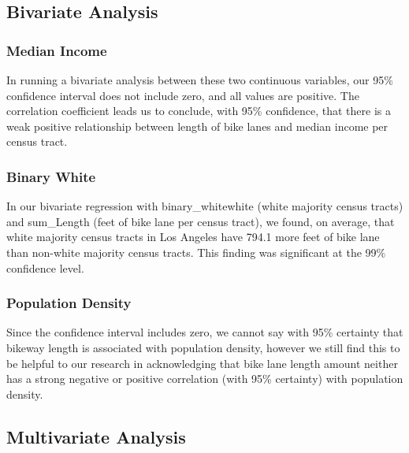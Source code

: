 \documentclass[
]{article}
\begin{document}
\hypertarget{bivariate-analysis}{%
\subsection{Bivariate Analysis}\label{bivariate-analysis}}

\hypertarget{median-income}{%
\subsubsection{Median Income}\label{median-income}}

In running a bivariate analysis between these two continuous variables,
our 95\% confidence interval does not include zero, and all values are
positive. The correlation coefficient leads us to conclude, with 95\%
confidence, that there is a weak positive relationship between length of
bike lanes and median income per census tract.

\hypertarget{binary-white}{%
\subsubsection{Binary White}\label{binary-white}}

In our bivariate regression with binary\_whitewhite (white majority
census tracts) and sum\_Length (feet of bike lane per census tract), we
found, on average, that white majority census tracts in Los Angeles have
794.1 more feet of bike lane than non-white majority census tracts. This
finding was significant at the 99\% confidence level.

\hypertarget{population-density}{%
\subsubsection{Population Density}\label{population-density}}

Since the confidence interval includes zero, we cannot say with 95\%
certainty that bikeway length is associated with population density,
however we still find this to be helpful to our research in
acknowledging that bike lane length amount neither has a strong negative
or positive correlation (with 95\% certainty) with population density.

\hypertarget{multivariate-analysis}{%
\subsection{Multivariate Analysis}\label{multivariate-analysis}}

 
  \providecommand{\huxb}[2]{\arrayrulecolor[RGB]{#1}\global\arrayrulewidth=#2pt}
  \providecommand{\huxvb}[2]{\color[RGB]{#1}\vrule width #2pt}
  \providecommand{\huxtpad}[1]{\rule{0pt}{#1}}
  \providecommand{\huxbpad}[1]{\rule[-#1]{0pt}{#1}}
\end{document}
